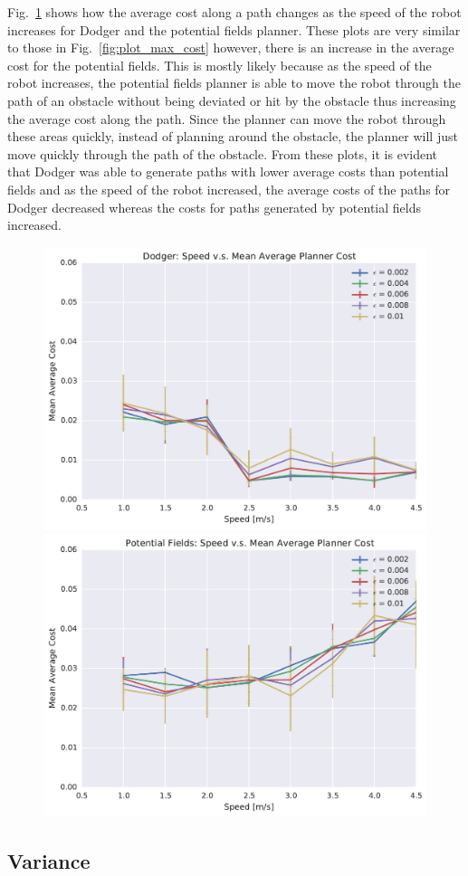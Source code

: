 Fig.~\ref{fig:plot_avg_cost} shows how the average cost along a path changes as
the speed of the robot increases for Dodger and the potential fields planner.
These plots are very similar to those in Fig.~\ref{fig:plot_max_cost} however,
there is an increase in the average cost for the potential fields. This is
mostly likely because as the speed of the robot increases, the potential fields
planner is able to move the robot through the path of an obstacle without being
deviated or hit by the obstacle thus increasing the average cost along the
path. Since the planner can move the robot through these areas quickly, instead
of planning around the obstacle, the planner will just move quickly through the
path of the obstacle. From these plots, it is evident that Dodger was able to
generate paths with lower average costs than potential fields and as the speed
of the robot increased, the average costs of the paths for Dodger decreased
whereas the costs for paths generated by potential fields increased.

\begin{figure}[h!]
    \centering
    \includegraphics[width=0.48\linewidth]{figs/planner_mean_avg_cost_0}
    \includegraphics[width=0.48\linewidth]{figs/pf_mean_avg_cost_0}
    \caption{}
    \label{fig:plot_avg_cost}
\end{figure}

\subsection{Variance}

